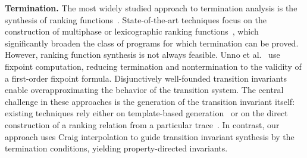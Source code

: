 \textbf{Termination.} 
The most widely studied approach to termination analysis is the 
synthesis of ranking functions~\cite{DBLP:conf/vmcai/PodelskiR04,
DBLP:conf/cav/KuraUH20,DBLP:journals/jacm/Ben-AmramG14,
DBLP:journals/jar/GieslABEFFHOPSS17,DBLP:conf/esop/SaritaSGSV26,
DBLP:conf/tacas/UrbanGK16,FedyukovichZG18,RileyF25}.
State-of-the-art techniques focus on the construction of 
multiphase or lexicographic ranking 
functions~\cite{DBLP:journals/jacm/Ben-AmramG14,FedyukovichZG18}, which 
significantly broaden the class of programs for which termination 
can be proved. However, ranking function synthesis is not always feasible.
Unno et al.~\cite{DBLP:journals/pacmpl/UnnoTGK23} use fixpoint computation, reducing termination and nontermination to the validity of a first-order fixpoint formula.
Disjunctively well-founded transition 
invariants~\cite{DBLP:conf/lics/PodelskiR04,DBLP:conf/sas/CookPR05,
DBLP:conf/cav/KroeningSTW10,DBLP:conf/tacas/TsitovichSWK11} enable overapproximating the behavior of the transition
system. %
The central challenge in these approaches is the generation of the
transition invariant itself: existing techniques rely either on 
template-based generation~\cite{DBLP:conf/tacas/TsitovichSWK11} or on the direct construction of a 
ranking relation from a particular trace~\cite{DBLP:conf/sas/CookPR05}. 
In contrast, our approach 
uses Craig interpolation to guide transition invariant synthesis 
by the termination conditions, yielding property-directed invariants.







